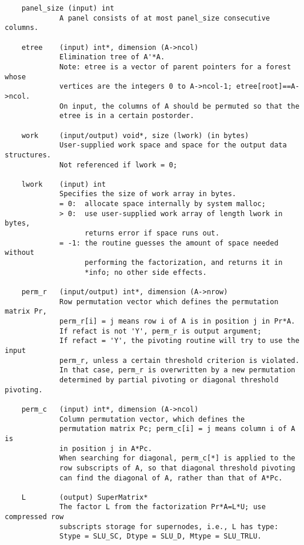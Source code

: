 \begin{verbatim}
    panel_size (input) int
             A panel consists of at most panel_size consecutive columns.
   
    etree    (input) int*, dimension (A->ncol)
             Elimination tree of A'*A.
             Note: etree is a vector of parent pointers for a forest whose
             vertices are the integers 0 to A->ncol-1; etree[root]==A->ncol.
             On input, the columns of A should be permuted so that the
             etree is in a certain postorder.
   
    work     (input/output) void*, size (lwork) (in bytes)
             User-supplied work space and space for the output data structures.
             Not referenced if lwork = 0;
   
    lwork    (input) int
             Specifies the size of work array in bytes.
             = 0:  allocate space internally by system malloc;
             > 0:  use user-supplied work array of length lwork in bytes,
                   returns error if space runs out.
             = -1: the routine guesses the amount of space needed without
                   performing the factorization, and returns it in
                   *info; no other side effects.
   
    perm_r   (input/output) int*, dimension (A->nrow)
             Row permutation vector which defines the permutation matrix Pr,
             perm_r[i] = j means row i of A is in position j in Pr*A.
             If refact is not 'Y', perm_r is output argument;
             If refact = 'Y', the pivoting routine will try to use the input
             perm_r, unless a certain threshold criterion is violated.
             In that case, perm_r is overwritten by a new permutation
             determined by partial pivoting or diagonal threshold pivoting.
   
    perm_c   (input) int*, dimension (A->ncol)
             Column permutation vector, which defines the 
             permutation matrix Pc; perm_c[i] = j means column i of A is 
             in position j in A*Pc.
             When searching for diagonal, perm_c[*] is applied to the
             row subscripts of A, so that diagonal threshold pivoting
             can find the diagonal of A, rather than that of A*Pc.
   
    L        (output) SuperMatrix*
             The factor L from the factorization Pr*A=L*U; use compressed row 
             subscripts storage for supernodes, i.e., L has type: 
             Stype = SLU_SC, Dtype = SLU_D, Mtype = SLU_TRLU.
   

\end{verbatim}
